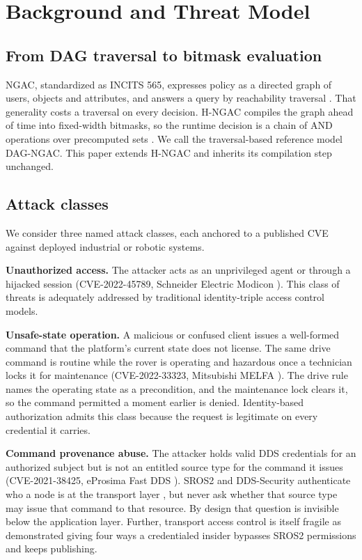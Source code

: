 \documentclass[conference]{IEEEtran}
\newcommand{\new}[1]{#1}
\begin{document}
\section{Background and Threat Model}
\label{sec:background}

\subsection{From DAG traversal to bitmask evaluation}

NGAC, standardized as INCITS 565, expresses policy as a directed graph of users, objects and attributes, and answers a query by reachability traversal \cite{incits565, ferraiolo2011policymachine}. That generality costs a traversal on every decision. H-NGAC compiles the graph ahead of time into fixed-width bitmasks, so the runtime decision is a chain of AND operations over precomputed sets \cite{karim2026dcas}. We call the traversal-based reference model DAG-NGAC. This paper extends H-NGAC and inherits its compilation step unchanged.

\subsection{Attack classes}

We consider three named attack classes, each anchored to a published CVE against deployed industrial or robotic systems.

\textbf{Unauthorized access.} The attacker acts as an unprivileged agent or through a hijacked session (CVE-2022-45789, Schneider Electric Modicon \cite{cve202245789}). This class of threats is adequately addressed by traditional identity-triple access control models.

\textbf{Unsafe-state operation.} A malicious or confused client issues a well-formed command that the platform's current state does not license. \new{The same drive command is routine while the rover is operating and hazardous once a technician locks it for maintenance} (CVE-2022-33323, Mitsubishi MELFA \cite{cve202233323}). \new{The drive rule names the operating state as a precondition, and the maintenance lock clears it, so the command permitted a moment earlier is denied.} Identity-based authorization admits this class because the request is legitimate on every credential it carries.

\textbf{Command provenance abuse.} The attacker holds valid DDS credentials for an authorized subject but is not an entitled source type for the command it issues (CVE-2021-38425, eProsima Fast DDS \cite{cve202138425}). SROS2 and DDS-Security authenticate who a node is at the transport layer \cite{mayoralvilches2022sros2, omgddssec}, but never ask whether that source type may issue that command to that resource. By design that question is invisible below the application layer. Further, transport access control is itself fragile as \cite{deng2022insecurity} demonstrated giving four ways a credentialed insider bypasses SROS2 permissions and keeps publishing.
\end{document}
